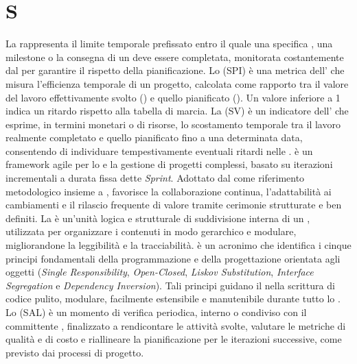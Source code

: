 \section{S}
La  rappresenta il limite temporale prefissato entro il quale una specifica , una milestone o la consegna di un  deve essere completata, monitorata costantemente dal  per garantire il rispetto della pianificazione.
Lo  (SPI) è una metrica dell' che misura l'efficienza temporale di un progetto, calcolata come rapporto tra il valore del lavoro effettivamente svolto () e quello pianificato (). Un valore inferiore a 1 indica un ritardo rispetto alla tabella di marcia.
La  (SV) è un indicatore dell' che esprime, in termini monetari o di risorse, lo scostamento temporale tra il lavoro realmente completato e quello pianificato fino a una determinata data, consentendo di individuare tempestivamente eventuali ritardi nelle .
 è un framework agile per lo  e la gestione di progetti complessi, basato su iterazioni incrementali a durata fissa dette \emph{Sprint}. Adottato dal  come riferimento metodologico insieme a , favorisce la collaborazione continua, l'adattabilità ai cambiamenti e il rilascio frequente di valore tramite cerimonie strutturate e  ben definiti.
La  è un'unità logica e strutturale di suddivisione interna di un , utilizzata per organizzare i contenuti in modo gerarchico e modulare, migliorandone la leggibilità e la tracciabilità.
 è un acronimo che identifica i cinque principi fondamentali della programmazione e della progettazione orientata agli oggetti (\emph{Single Responsibility}, \emph{Open-Closed}, \emph{Liskov Substitution}, \emph{Interface Segregation} e \emph{Dependency Inversion}). Tali principi guidano il  nella scrittura di codice pulito, modulare, facilmente estensibile e manutenibile durante tutto lo .
Lo  (SAL) è un momento di verifica periodica, interno o condiviso con il committente , finalizzato a rendicontare le attività svolte, valutare le metriche di qualità e di costo e riallineare la pianificazione per le iterazioni successive, come previsto dai processi di progetto.
